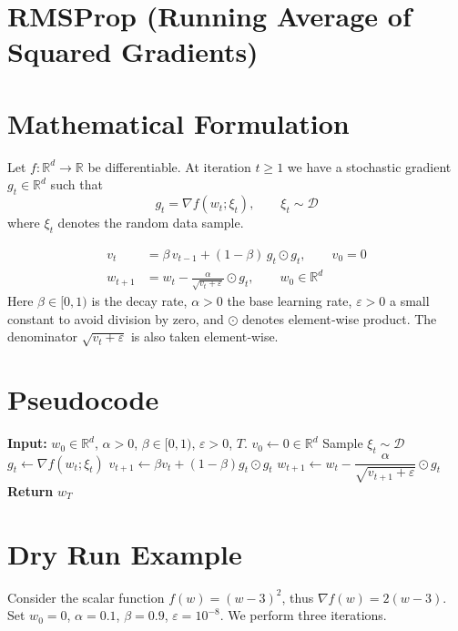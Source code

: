 \documentclass{article}
\newcommand{\R}{\mathbb{R}}
\begin{document}
\section*{RMSProp (Running Average of Squared Gradients)}

\section*{Mathematical Formulation}
Let $f:\R^{d}\rightarrow\R$ be differentiable.  
At iteration $t\ge 1$ we have a stochastic gradient $g_{t}\in\R^{d}$ such that  
\[
g_{t}= \nabla f(w_{t};\xi_{t}),\qquad \xi_{t}\sim\mathcal{D}
\]
where $\xi_{t}$ denotes the random data sample.  

\begin{align}
v_{t} &= \beta\,v_{t-1}+(1-\beta)\,g_{t}\odot g_{t}, \qquad v_{0}=0 \label{eq:vt}\\[4pt]
w_{t+1} &= w_{t}-\frac{\alpha}{\sqrt{v_{t}+\varepsilon}}\odot g_{t}, \qquad w_{0}\in\R^{d} \label{eq:wt}
\end{align}
Here $\beta\in[0,1)$ is the decay rate, $\alpha>0$ the base learning rate, $\varepsilon>0$ a small constant to avoid division by zero, and $\odot$ denotes element‑wise product.  
The denominator $\sqrt{v_{t}+\varepsilon}$ is also taken element‑wise.

\section*{Pseudocode}
\begin{algorithm}
\caption{RMSProp}
\begin{algorithmic}[1]
\State \textbf{Input:} $w_{0}\in\R^{d}$, $\alpha>0$, $\beta\in[0,1)$, $\varepsilon>0$, $T$.
\State $v_{0}\gets 0\in\R^{d}$
    \State Sample $\xi_{t}\sim\mathcal{D}$ 
    \State $g_{t}\gets \nabla f(w_{t};\xi_{t})$
    \State $v_{t+1}\gets \beta v_{t}+(1-\beta) g_{t}\odot g_{t}$ 
    \State $w_{t+1}\gets w_{t}-\dfrac{\alpha}{\sqrt{v_{t+1}+\varepsilon}}\odot g_{t}$ 
\EndFor
\State \textbf{Return} $w_{T}$
\end{algorithmic}
\end{algorithm}

\section*{Dry Run Example}
Consider the scalar function $f(w)=(w-3)^{2}$, thus $\nabla f(w)=2(w-3)$.  
Set $w_{0}=0$, $\alpha=0.1$, $\beta=0.9$, $\varepsilon=10^{-8}$.  
We perform three iterations.
\end{document}
